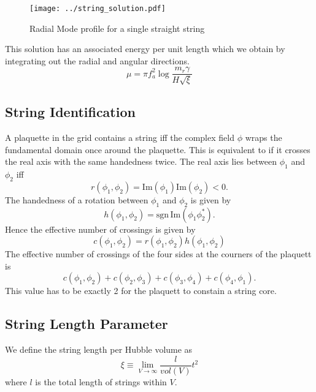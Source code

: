 \documentclass[a4paper]{article}
\begin{document}
\begin{figure}[H]
	\texttt{[image: ../string\_solution.pdf]}
	\caption{Radial Mode profile for a single straight string}
\end{figure}


This solution has an associated energy per unit length which we obtain by integrating out the radial and angular directions.
\begin{equation}
	\mu = \pi f_a^2 \log \frac{m_r \gamma}{H \sqrt{\xi}}
\end{equation}


\subsection{String Identification}
A plaquette in the grid contains a string iff the complex field $\phi$ wraps the fundamental domain once around the plaquette.
This is equivalent to if it crosses the real axis with the same handedness twice.
The real axis lies between $\phi_1$ and $\phi_2$ iff
\begin{equation}
	r(\phi_1, \phi_2) = \mathrm{Im}(\phi_1) \mathrm{Im}(\phi_2) < 0.
\end{equation} 
The handedness of a rotation between $\phi_1$ and $\phi_2$ is given by
\begin{equation}
	h(\phi_1, \phi_2) = \mathrm{sgn} \, \mathrm{Im} (\phi_1 \phi_2^*).
\end{equation}
Hence the effective number of crossings is given by
\begin{equation}
	c(\phi_1, \phi_2) = r(\phi_1, \phi_2) h(\phi_1, \phi_2)
\end{equation}
The effective number of crossings of the four sides at the courners of the plaquett is
\begin{equation}
	c(\phi_1, \phi_2) + c(\phi_2, \phi_3) + c(\phi_3, \phi_4) + c(\phi_4, \phi_1).
\end{equation}
This value has to be exactly 2 for the plaquett to constain a string core.

\subsection{String Length Parameter}
We define the string length per Hubble volume as
\begin{equation}
    \xi \equiv \lim_{V \to \infty} \frac{l}{vol(V)} t^2
\end{equation}
where $l$ is the total length of strings within $V$.
\end{document}
